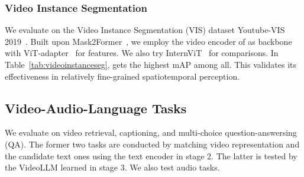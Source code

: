 
\subsubsection{Video Instance Segmentation} \label{sec:vis}
We evaluate on the Video Instance Segmentation (VIS) dataset Youtube-VIS 2019~\cite{yang2019video}. Built upon Mask2Former~\cite{cheng2021maskformer}, we employ the video encoder of {\modelname} as backbone with ViT-adapter~\cite{chen2022vitadapter} for features. We also try InternViT~\cite{chen2023internvl} for comparisons. In Table~\ref{tab:videoinstanceseg}, {\modelname} gets the highest mAP among all. This validates its effectiveness in relatively fine-grained spatiotemporal perception.


\subsection{Video-Audio-Language Tasks}
We evaluate {\modelname} on video retrieval, captioning, and multi-choice question-answersing (QA). The former two tasks are conducted by matching video representation and the candidate text ones using the text encoder in stage 2. The latter is tested by the VideoLLM learned in stage 3. We also test audio tasks.

